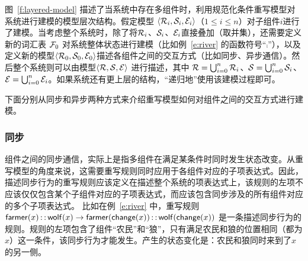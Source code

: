 图~\ref{f:layered-model} 描述了当系统中存在多组件时，利用规范化条件重写模型对系统进行建模的模型层次结构。假定模型 $\langle \mathcal{R}_i,\mathcal{S}_i,\mathcal{E}_i\rangle$（$1\le i\le n$）对子组件$i$进行了建模。当考虑整个系统时，除了将$\mathcal{R}_i$、$\mathcal{S}_i$、$\mathcal{E}_i$直接叠加（取并集），还需要定义新的词汇表 $\mathcal{F}_0$ 对系统整体状态进行建模（比如例~\ref{e:river} 的函数符号“$\comp$”），以及定义新的模型$\langle \mathcal{R}_0,\mathcal{S}_0,\mathcal{E}_0\rangle$描述各组件之间的交互方式（比如同步、异步通信）。然后整个系统则可以由模型$\langle \mathcal{R},\mathcal{S},\mathcal{E}\rangle$ 进行描述，其中 $\mathcal{R} = \bigcup^n_{i=0}\mathcal{R}_i$、$\mathcal{S} = \bigcup^n_{i=0}\mathcal{S}_i$、$\mathcal{E} = \bigcup^n_{i=0}\mathcal{E}_i$。如果系统还有更上层的结构，“递归地”使用该建模过程即可。

下面分别从同步和异步两种方式来介绍重写模型如何对组件之间的交互方式进行建模。

\subsubsection{同步}
\label{ss:sync}

组件之间的同步通信，实际上是指多组件在满足某条件时同时发生状态改变。从重写模型的角度来说，这需要重写规则同时应用于各组件对应的子项表达式。因此，描述同步行为的重写规则应该定义在描述整个系统的项表达式上，该规则的左项不应该仅仅包含某个子组件对应的子项表达式，而应该包含同步涉及的所有组件对应的多个子项表达式。
比如在例~\ref{e:river} 中，重写规则 $\operatorname{\mathsf{farmer}}(x)\operatorname{\mathsf{::}} \operatorname{\mathsf{wolf}}(x) \rightarrow \operatorname{\mathsf{farmer}}(\operatorname{\mathsf{change}}(x))\operatorname{\mathsf{::}}\operatorname{\mathsf{wolf}}(\operatorname{\mathsf{change}}(x))$ 是一条描述同步行为的规则。规则的左项包含了组件“农民”和“狼”，只有满足农民和狼的位置相同（都为$x$）这一条件，该同步行为才能发生。产生的状态变化是：农民和狼同时来到了$x$的另一侧。

